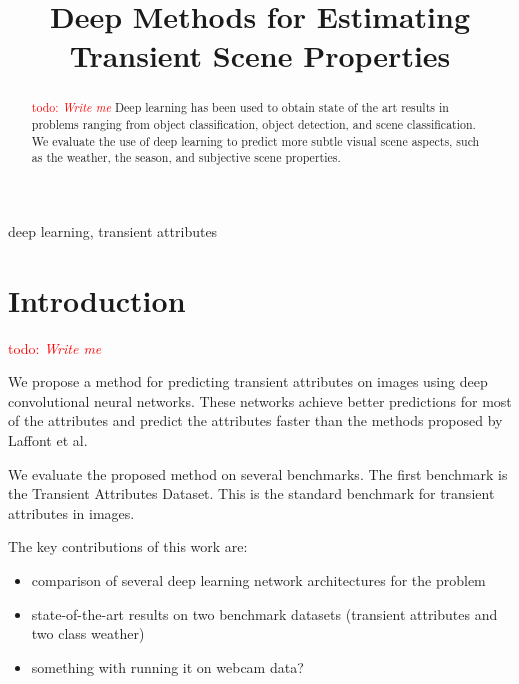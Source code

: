 \documentclass{article}
\title{Deep Methods for Estimating Transient Scene Properties}
\newcommand{\todo}[1]{\textcolor{red}{todo: {\em #1}}}
\begin{document}
%
\maketitle
%
\begin{abstract}
	
	\todo{Write me}
  Deep learning has been used to obtain state of the art results in
  problems ranging from object classification, object detection, and
  scene classification. We evaluate the use of deep learning to
  predict more subtle visual scene aspects, such as the weather, the
  season, and subjective scene properties. 

\end{abstract}
%
\begin{keywords}
	deep learning, transient attributes
\end{keywords}

\section{Introduction}
\todo{Write me}

We propose a method for predicting transient attributes on images using
deep convolutional neural networks.  These networks achieve better 
predictions for most of the attributes and predict the attributes
faster than the methods proposed by Laffont\cite{Laffont14} et al.

We evaluate the proposed method on several benchmarks.  The first 
benchmark is the Transient Attributes Dataset\cite{Laffont14}.  This 
is the standard benchmark for transient attributes in images. 


The key contributions of this work are:
\begin{itemize}

  \item comparison of several deep learning network architectures for
    the problem

  \item state-of-the-art results on two benchmark datasets (transient
    attributes and two class weather)

  \item something with running it on webcam data?

\end{itemize}
\end{document}
